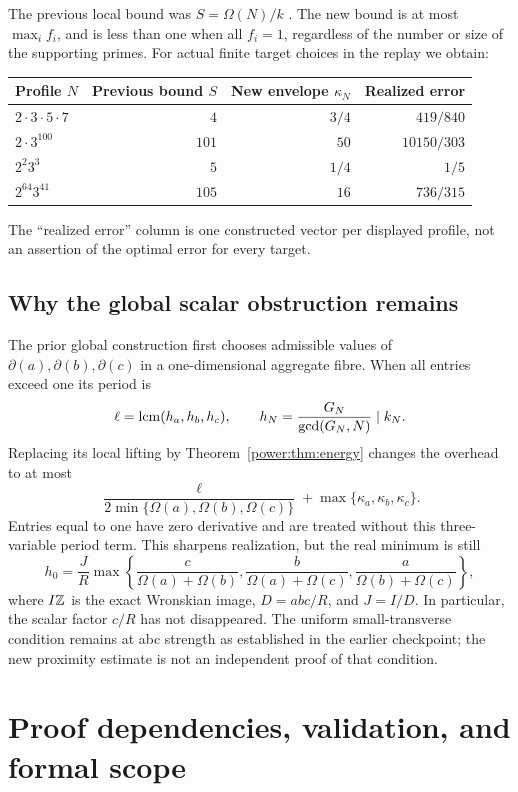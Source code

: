 The previous local bound was $S=\Omega(N)/k$ \cite{power:transverse}. The new
bound is at most $\max_i f_i$, and is less than one when all $f_i=1$,
regardless of the number or size of the supporting primes. For actual
finite target choices in the replay we obtain:
\begin{center}
\begin{tabular}{lrrr}\toprule
Profile $N$ & Previous bound $S$ & New envelope $\kappa_N$ & Realized error\\\midrule
$2\cdot3\cdot5\cdot7$ & $4$ & $3/4$ & $419/840$\\
$2\cdot3^{100}$ & $101$ & $50$ & $10150/303$\\
$2^2 3^3$ & $5$ & $1/4$ & $1/5$\\
$2^{64}3^{41}$ & $105$ & $16$ & $736/315$\\\bottomrule
\end{tabular}
\end{center}
The ``realized error'' column is one constructed vector per displayed
profile, not an assertion of the optimal error for every target.

\subsection{Why the global scalar obstruction remains}
The prior global construction first chooses admissible values of
$\partial(a),\partial(b),\partial(c)$ in a one-dimensional aggregate
fibre. When all entries exceed one its period is
\[
\ell=\operatorname{lcm}(h_a,h_b,h_c),\qquad
h_N=\frac{G_N}{\gcd(G_N,N)}\mid k_N.
\]
Replacing its local lifting by Theorem~\ref{power:thm:energy} changes the overhead
to at most
\[
\frac{\ell}{2\min\{\Omega(a),\Omega(b),\Omega(c)\}}
+\max\{\kappa_a,\kappa_b,\kappa_c\}.
\]
Entries equal to one have zero derivative and are treated without this
three-variable period term. This sharpens realization, but the real
minimum is still
\[
h_0=\frac JR\max\left\{
\frac c{\Omega(a)+\Omega(b)},
\frac b{\Omega(a)+\Omega(c)},
\frac a{\Omega(b)+\Omega(c)}\right\},
\]
where $I\mathbb Z$ is the exact Wronskian image, $D=abc/R$, and $J=I/D$.
In particular, the scalar factor $c/R$ has not disappeared.
The uniform small-transverse condition remains at abc strength as established
in the earlier checkpoint; the new proximity estimate is not an independent
proof of that condition.

\section{Proof dependencies, validation, and formal scope}
